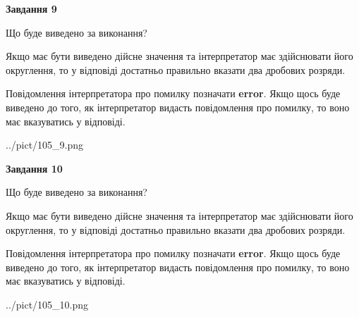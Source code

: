 \documentclass[12pt, ukrainian]{article}
\begin{document}
{\begin {Large}
{\begin {center}\textbf{Завдання 9}\end {center}}\par
Що буде виведено за виконання? \par

Якщо має бути виведено дійсне значення та інтерпретатор має здійснювати його округлення, 
то у відповіді достатньо правильно вказати два дробових розряди.

Повідомлення інтерпретатора про помилку позначати \textbf{error}.
Якщо щось буде виведено до того, як інтерпретатор видасть повідомлення про помилку, 
то воно має вказуватись у відповіді. \par

\begin{center}
	{../pict/105_9.png}
\end{center}
\newpage

{\begin {center}\textbf{Завдання 10}\end {center}}\par
Що буде виведено за виконання? \par

Якщо має бути виведено дійсне значення та інтерпретатор має здійснювати його округлення, 
то у відповіді достатньо правильно вказати два дробових розряди.

Повідомлення інтерпретатора про помилку позначати \textbf{error}.
Якщо щось буде виведено до того, як інтерпретатор видасть повідомлення про помилку, 
то воно має вказуватись у відповіді. \par

\begin{center}
	{../pict/105_10.png}
\end{center}
\newpage

\end {Large}}
\end{document}
